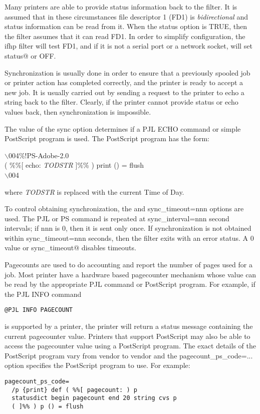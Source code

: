 \documentclass[a4paper]{article}
\begin{document}
Many printers are able to provide status information back to the
filter.
It is assumed that in these circumstances file descriptor 1
(FD1)
is
{\itshape bidirectional\/}
and status information can be read from it.
When the
{\ttfamily status}
option is TRUE,
then the filter assumes that it can read FD1.
In order to simplify configuration,
the
{\ttfamily ifhp}
filter will test FD1, and if it is not
a serial port or a network socket, will set
{\ttfamily status@}
or OFF.

Synchronization is usually done in order to ensure that a previously
spooled job or printer action has completed correctly,
and the printer is ready to accept a new job.
It is usually carried out by sending a request to the printer to
echo a string back to the filter.
Clearly,
if the printer cannot provide status or echo values back,
then synchronization is impossible.

The value of the
{\ttfamily sync} option determines if a PJL ECHO command or simple PostScript 
program is used.
The PostScript program has the form:
\begin{tscreen}
$\backslash$004\%!PS-Adobe-2.0\\ 
( \%\%{[} echo: {\itshape TODSTR\/} {]}\%\% ) print () = flush\\ 
$\backslash$004
\end{tscreen}


where {\itshape TODSTR\/} is replaced with the current Time of Day.

To control obtaining synchronization,
the
and
{\ttfamily sync\_timeout=nnn}
options are used.
The PJL or PS command is repeated at
{\ttfamily sync\_interval=nnn}
second intervals; if nnn is 0, then it is sent only once.
If synchronization is not obtained within
{\ttfamily sync\_timeout=nnn}
seconds, then the filter exits with an error status.
A 0 value or
{\ttfamily sync\_timeout@}
disables timeouts.

Pagecounts are used to do accounting and report the number of pages
used for a job.
Most printer have a hardware based pagecounter mechanism whose value
can be read by the appropriate PJL command or PostScript program.
For example, if the PJL INFO command
\begin{tscreen}
\begin{verbatim}
@PJL INFO PAGECOUNT
\end{verbatim}
\end{tscreen}

is supported by a printer,
the printer will return a status message containing the current pagecounter
value.
Printers that support PostScript may also be able to access the pagecounter
value using a PostScript program.
The exact details of the PostScript program vary from vendor to vendor and
the
{\ttfamily pagecount\_ps\_code=...}
option specifies the PostScript program to use.
For example:
\begin{tscreen}
\begin{verbatim}
pagecount_ps_code=
  /p {print} def ( %%[ pagecount: ) p
  statusdict begin pagecount end 20 string cvs p
  ( ]%% ) p () = flush
\end{verbatim}
\end{tscreen}
\end{document}
